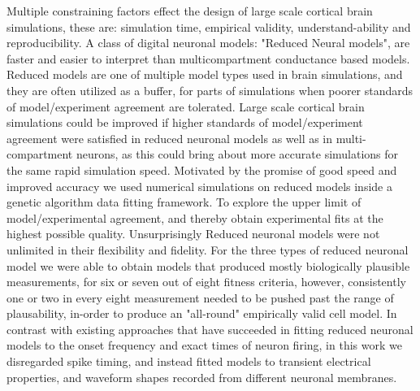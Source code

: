 
Multiple constraining factors effect the design of large scale cortical brain simulations, these are: simulation time, empirical validity, understand-ability and reproducibility. A class of digital neuronal models: "Reduced Neural models", are faster and easier to interpret than multicompartment conductance based models. Reduced models are one of multiple model types used in brain simulations, and they are often utilized as a buffer, for parts of simulations when poorer standards of model/experiment agreement are  tolerated. Large scale cortical brain simulations could be improved if higher standards of model/experiment agreement were satisfied in reduced neuronal models as well as in multi-compartment neurons, as this could bring about more accurate simulations for the same rapid simulation speed. Motivated by the promise of good speed and improved accuracy we used numerical simulations on reduced models inside a genetic algorithm data fitting framework. To explore the upper limit of model/experimental agreement, and thereby obtain experimental fits at the highest possible quality. Unsurprisingly Reduced neuronal models were not unlimited in their flexibility and fidelity. For the three types of reduced neuronal model we were able to obtain models that produced mostly biologically plausible measurements, for six or seven out of eight fitness criteria, however, consistently one or two in every eight measurement needed to be pushed past the range of plausability, in-order to produce an "all-round" empirically valid cell model. In contrast with existing approaches that have succeeded in fitting reduced neuronal models to the onset frequency and exact times of neuron firing, in this work we disregarded spike timing, and instead fitted models to transient electrical properties, and waveform shapes recorded from different neuronal membranes.\\
\\
\\ 

\\


